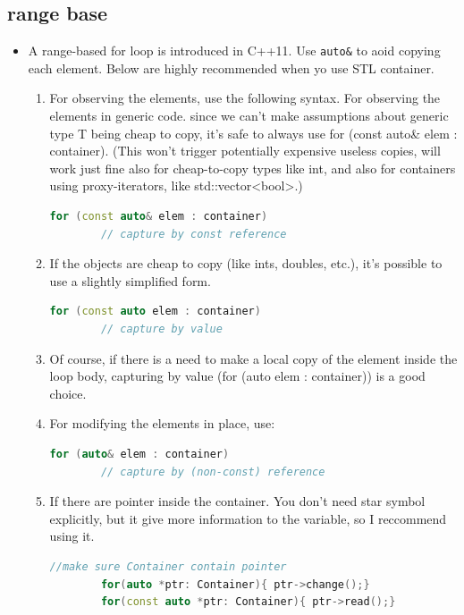 \documentclass[a4paper,12pt,twoside]{book}
\begin{document}
\subsection{range base}
\begin{itemize}
	
	\item A range-based for loop is introduced in C++11. Use \texttt{auto\&} to aoid copying each element. Below are highly recommended when yo use STL container.
	
	\begin{enumerate}
		\item For observing the elements, use the following syntax. For observing the elements in generic code. since we can't make assumptions about generic type T being cheap to copy, it's safe to always use for (const auto\& elem : container).
		(This won't trigger potentially expensive useless copies, will work just fine also for cheap-to-copy types like int, and also for containers using proxy-iterators, like std::vector<bool>.)
		\begin{lstlisting}[frame=single, language=c++]
		for (const auto& elem : container)    
		// capture by const reference
		\end{lstlisting}	
		
		
		\item If the objects are cheap to copy (like ints, doubles, etc.), it's possible to use a slightly simplified form. 
		
		\begin{lstlisting}[frame=single, language=c++]
		for (const auto elem : container)   
		// capture by value
		\end{lstlisting}            
		
		\item Of course, if there is a need to make a local copy of the element inside the loop body, capturing by value (for (auto elem : container)) is a good choice.
		
		\item For modifying the elements in place, use:
		\begin{lstlisting}[frame=single, language=c++]
		for (auto& elem : container)    
		// capture by (non-const) reference
		\end{lstlisting}
		
		
		
		\item If there are pointer inside the container. You don't need star symbol explicitly, but it give more information to the variable, so I reccommend using it.
		\begin{lstlisting}[frame=single, language=c++]
		//make sure Container contain pointer
		for(auto *ptr: Container){ ptr->change();}
		for(const auto *ptr: Container){ ptr->read();}
		\end{lstlisting}
		

\end{enumerate}
\end{itemize}
\end{document}
